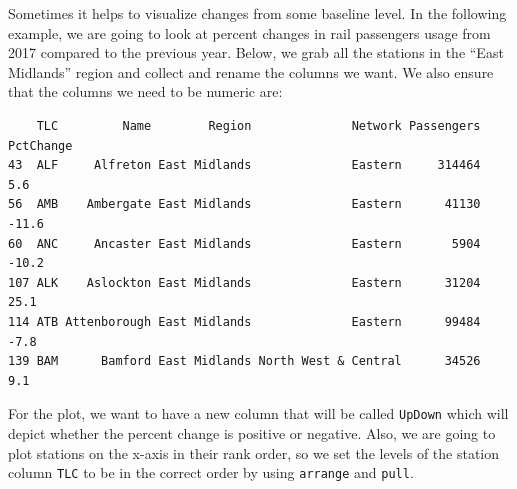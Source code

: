 \documentclass[
  letterpaper,
  DIV=11,
  numbers=noendperiod]{scrreprt}
\newenvironment{Shaded}{\begin{snugshade}}{\end{snugshade}}
\newcommand{\DecValTok}[1]{\textcolor[rgb]{0.68,0.00,0.00}{#1}}
\newcommand{\FunctionTok}[1]{\textcolor[rgb]{0.28,0.35,0.67}{#1}}
\newcommand{\NormalTok}[1]{\textcolor[rgb]{0.00,0.23,0.31}{#1}}
\newcommand{\OtherTok}[1]{\textcolor[rgb]{0.00,0.23,0.31}{#1}}
\newcommand{\SpecialCharTok}[1]{\textcolor[rgb]{0.37,0.37,0.37}{#1}}
\newcommand{\StringTok}[1]{\textcolor[rgb]{0.13,0.47,0.30}{#1}}
\begin{document}
Sometimes it helps to visualize changes from some baseline level. In the
following example, we are going to look at percent changes in rail
passengers usage from 2017 compared to the previous year. Below, we grab
all the stations in the ``East Midlands'' region and collect and rename
the columns we want. We also ensure that the columns we need to be
numeric are:

\begin{Shaded}
\end{Shaded}

\begin{verbatim}
    TLC         Name        Region              Network Passengers PctChange
43  ALF     Alfreton East Midlands              Eastern     314464       5.6
56  AMB    Ambergate East Midlands              Eastern      41130     -11.6
60  ANC     Ancaster East Midlands              Eastern       5904     -10.2
107 ALK    Aslockton East Midlands              Eastern      31204      25.1
114 ATB Attenborough East Midlands              Eastern      99484      -7.8
139 BAM      Bamford East Midlands North West & Central      34526       9.1
\end{verbatim}

For the plot, we want to have a new column that will be called
\texttt{UpDown} which will depict whether the percent change is positive
or negative. Also, we are going to plot stations on the x-axis in their
rank order, so we set the levels of the station column \texttt{TLC} to
be in the correct order by using \texttt{arrange} and \texttt{pull}.
\end{document}
